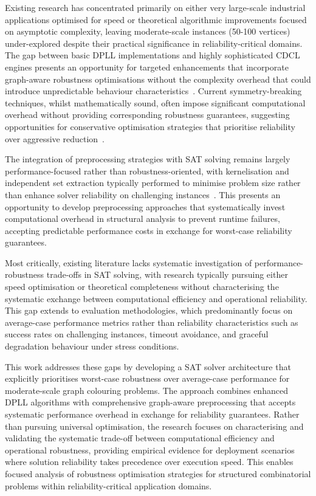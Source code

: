 Existing research has concentrated primarily on either very large-scale industrial applications optimised for speed or theoretical algorithmic improvements focused on asymptotic complexity, leaving moderate-scale instances (50-100 vertices) under-explored despite their practical significance in reliability-critical domains. The gap between basic DPLL implementations and highly sophisticated CDCL engines presents an opportunity for targeted enhancements that incorporate graph-aware robustness optimisations without the complexity overhead that could introduce unpredictable behaviour characteristics~\cite{moskewicz2001chaff,marques2009handbook}. Current symmetry-breaking techniques, whilst mathematically sound, often impose significant computational overhead without providing corresponding robustness guarantees, suggesting opportunities for conservative optimisation strategies that prioritise reliability over aggressive reduction~\cite{crawford1996symmetry}.

The integration of preprocessing strategies with SAT solving remains largely perfor\-mance-focused rather than robustness-oriented, with kernelisation and independent set extraction typically performed to minimise problem size rather than enhance solver reliability on challenging instances~\cite{lin2012coloring,jansen2013data}. This presents an opportunity to develop preprocessing approaches that systematically invest computational overhead in structural analysis to prevent runtime failures, accepting predictable performance costs in exchange for worst-case reliability guarantees.

Most critically, existing literature lacks systematic investigation of performance-robustness trade-offs in SAT solving, with research typically pursuing either speed optimisation or theoretical completeness without characterising the systematic exchange between computational efficiency and operational reliability. This gap extends to evaluation methodologies, which predominantly focus on average-case performance metrics rather than reliability characteristics such as success rates on challenging instances, timeout avoidance, and graceful degradation behaviour under stress conditions.

This work addresses these gaps by developing a SAT solver architecture that explicitly prioritises worst-case robustness over average-case performance for moderate-scale graph colouring problems. The approach combines enhanced DPLL algorithms with comprehensive graph-aware preprocessing that accepts systematic performance overhead in exchange for reliability guarantees. Rather than pursuing universal optimisation, the research focuses on characterising and validating the systematic trade-off between computational efficiency and operational robustness, providing empirical evidence for deployment scenarios where solution reliability takes precedence over execution speed. This enables focused analysis of robustness optimisation strategies for structured combinatorial problems within reliability-critical application domains.